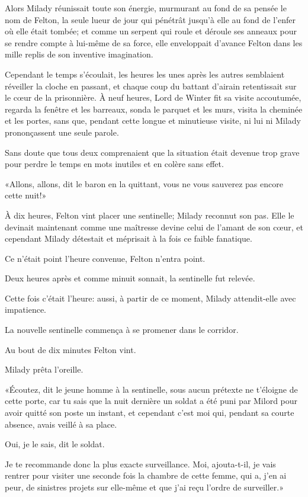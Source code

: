Alors Milady réunissait toute son énergie, murmurant au fond de sa pensée le nom de Felton, la seule lueur de jour qui pénétrât jusqu'à elle au fond de l'enfer où elle était tombée; et comme un serpent qui roule et déroule ses anneaux pour se rendre compte à lui-même de sa force, elle enveloppait d'avance Felton dans les mille replis de son inventive imagination. 

Cependant le temps s'écoulait, les heures les unes après les autres semblaient réveiller la cloche en passant, et chaque coup du battant d'airain retentissait sur le cœur de la prisonnière. À neuf heures, Lord de Winter fit sa visite accoutumée, regarda la fenêtre et les barreaux, sonda le parquet et les murs, visita la cheminée et les portes, sans que, pendant cette longue et minutieuse visite, ni lui ni Milady prononçassent une seule parole. 

Sans doute que tous deux comprenaient que la situation était devenue trop grave pour perdre le temps en mots inutiles et en colère sans effet. 

«Allons, allons, dit le baron en la quittant, vous ne vous sauverez pas encore cette nuit!» 

À dix heures, Felton vint placer une sentinelle; Milady reconnut son pas. Elle le devinait maintenant comme une maîtresse devine celui de l'amant de son cœur, et cependant Milady détestait et méprisait à la fois ce faible fanatique. 

Ce n'était point l'heure convenue, Felton n'entra point. 

Deux heures après et comme minuit sonnait, la sentinelle fut relevée. 

Cette fois c'était l'heure: aussi, à partir de ce moment, Milady attendit-elle avec impatience. 

La nouvelle sentinelle commença à se promener dans le corridor. 

Au bout de dix minutes Felton vint. 

Milady prêta l'oreille. 

«Écoutez, dit le jeune homme à la sentinelle, sous aucun prétexte ne t'éloigne de cette porte, car tu sais que la nuit dernière un soldat a été puni par Milord pour avoir quitté son poste un instant, et cependant c'est moi qui, pendant sa courte absence, avais veillé à sa place. 

\speak  Oui, je le sais, dit le soldat. 

\speak  Je te recommande donc la plus exacte surveillance. Moi, ajouta-t-il, je vais rentrer pour visiter une seconde fois la chambre de cette femme, qui a, j'en ai peur, de sinistres projets sur elle-même et que j'ai reçu l'ordre de surveiller.» 

